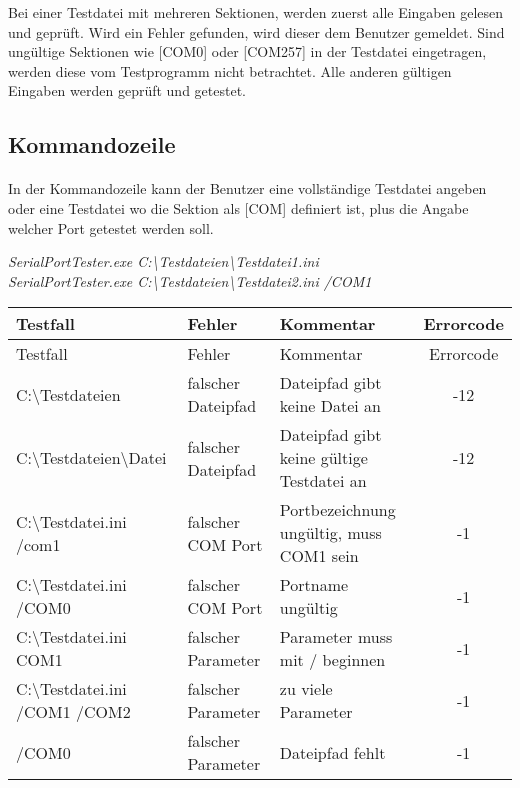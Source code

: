Bei einer Testdatei mit mehreren Sektionen, werden zuerst alle Eingaben gelesen und geprüft. Wird ein Fehler gefunden, wird dieser dem Benutzer gemeldet. Sind ungültige Sektionen wie [COM0] oder [COM257] in der Testdatei eingetragen, werden diese vom Testprogramm nicht betrachtet. Alle anderen gültigen Eingaben werden geprüft und getestet.


\subsection{Kommandozeile}
\paragraph{}
In der Kommandozeile kann der Benutzer eine vollständige Testdatei angeben oder eine Testdatei wo die Sektion als [COM] definiert ist, plus die Angabe welcher Port getestet werden soll.

\hspace*{10mm}\textit{SerialPortTester.exe C:\textbackslash Testdateien\textbackslash Testdatei1.ini}\\
\hspace*{10mm}\textit{SerialPortTester.exe C:\textbackslash Testdateien\textbackslash Testdatei2.ini /COM1}\\

\begin{longtable}{||l|p{3cm}|p{5cm}|c||}
\hline
Testfall & Fehler & Kommentar & Errorcode \\ \hline\hline
\endfirsthead
\hline
Testfall & Fehler & Kommentar & Errorcode \\ \hline\hline
\endhead

C:\textbackslash Testdateien & falscher Dateipfad & Dateipfad gibt keine Datei an & -12\\ \hline
C:\textbackslash Testdateien\textbackslash Datei & falscher Dateipfad & Dateipfad gibt keine gültige Testdatei an & -12\\ \hline

C:\textbackslash Testdatei.ini /com1 & falscher COM Port & Portbezeichnung ungültig, muss COM1 sein & -1\\ \hline
C:\textbackslash Testdatei.ini /COM0 & falscher COM Port & Portname ungültig & -1\\ \hline
C:\textbackslash Testdatei.ini COM1 & falscher Parameter & Parameter muss mit / beginnen & -1\\ \hline

C:\textbackslash Testdatei.ini /COM1 /COM2& falscher Parameter & zu viele Parameter & -1\\ \hline
/COM0 & falscher Parameter & Dateipfad fehlt &-1 \\ \hline

\end{longtable}


